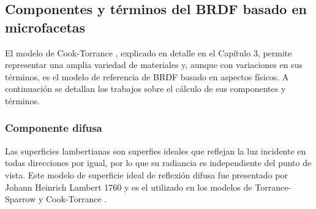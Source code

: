 
    \subsection{Componentes y t\'erminos del BRDF basado en microfacetas}
    El modelo de Cook-Torrance \autocite{cooktorrance}, explicado en detalle en el Cap\'itulo 3, permite representar una amplia
    variedad de materiales y, aunque con variaciones en sus t\'erminos, es el modelo de referencia de BRDF basado en aspectos f\'isicos.
    A continuaci\'on se detallan los trabajos sobre el c\'alculo de sus componentes y t\'erminos.


        \subsubsection{Componente difusa}
            Las superficies lambertianas son superfies ideales que reflejan la luz incidente en todas direcciones por igual, por lo
            que su radiancia es independiente del punto de vista. Este modelo de superficie ideal de reflexi\'on difusa fue presentado
            por Johann Heinrich Lambert 1760 \autocite{lambert} y es el utilizado en los modelos de Torrance-Sparrow \autocite{torrancesparrow}
            y Cook-Torrance \autocite{cooktorrance}.\\

